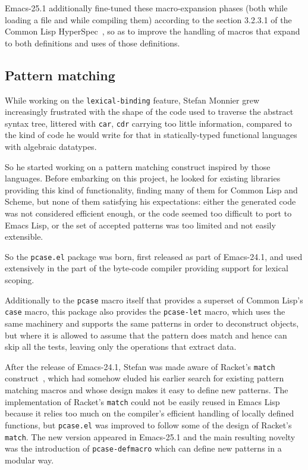 \documentclass[format=acmsmall, review]{acmart}
\newcommand \Elisp {Emacs Lisp}
\begin{document}
Emacs-25.1 additionally fine-tuned these macro-expansion phases (both
while loading a file and while compiling them) according to the section
3.2.3.1 of the Common Lisp HyperSpec~\cite{HyperSpec}, so as to improve the
handling of macros that expand to both definitions and uses of
those definitions.

\subsection{Pattern matching}           %
\label{sec:pcase}

While working on the \texttt{lexical-binding} feature, Stefan Monnier grew
increasingly frustrated with the shape of the code used to traverse the
abstract syntax tree, littered with \texttt{car}, \texttt{cdr} carrying too
little information, compared to the kind of code he would write for that in
statically-typed functional languages with algebraic datatypes.

So he started working on a pattern matching construct inspired by those
languages.  Before embarking on this project, he looked for existing
libraries providing this kind of functionality, finding many of them for
Common Lisp and Scheme, but none of them satisfying his expectations: either
the generated code was not considered efficient enough, or the code seemed
too difficult to port to \Elisp{}, or the set of accepted patterns was too
limited and not easily extensible.

So the \texttt{pcase.el} package was born,
first released as part of Emacs-24.1, and used extensively in the part
of the byte-code compiler providing support for lexical scoping.

Additionally to the \texttt{pcase} macro itself that provides a superset of
Common Lisp's \texttt{case} macro, this package also provides the
\texttt{pcase-let} macro, which uses the same machinery and supports the same
patterns in order to deconstruct objects, but where it is allowed to assume
that the pattern does match and hence can skip all the tests, leaving only the
operations that extract data.

After the release of Emacs-24.1, Stefan was made aware of Racket's
\texttt{match} construct~\cite{RacketReference2018}, which had somehow eluded
his earlier search for
existing pattern matching macros and whose design makes it easy to define
new patterns.  The implementation of Racket's \texttt{match} could not be
easily reused in \Elisp{} because it relies too much on the compiler's
efficient handling of locally defined functions, but \texttt{pcase.el} was
improved to follow some of the design of Racket's \texttt{match}.
The new version appeared in Emacs-25.1 and the main resulting novelty was the
introduction of \texttt{pcase-defmacro} which can define new patterns
in a modular way. %
\end{document}
